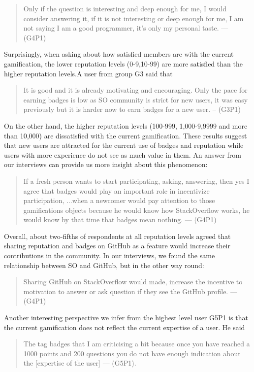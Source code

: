 \documentclass{sigchi}
\begin{document}
\begin{quote}
Only if the question is interesting and deep enough for me, I would consider answering it, if it is not interesting or deep enough for me, I am not saying I am a good programmer, it’s only my personal taste. --- (G4P1)
\end{quote}


Surprisingly, when asking about how satisfied members are with the current gamification, the lower reputation levels (0-9,10-99) are more satisfied than the higher reputation levels.A user from group G3 said that
\begin{quote}
It is good and it is already motivating and encouraging. Only the pace for earning badges is low as SO community is strict for new users, it was easy previously but it is harder now to earn badges for a new user. -- (G3P1)
\end{quote}

On the other hand, the higher  reputation levels (100-999, 1,000-9,9999 and more than 10,000) are dissatisfied with the current gamification.  These results suggest that new users are attracted for the current use of badges and reputation while users with more experience do not see as much value in them. An answer from our interviews can provide us more insight about this phenomenon:

\begin{quote}
If a fresh person wants to start participating, asking, answering, then yes I agree that badges would play an important role in incentivize participation, ...when a newcomer would pay attention to those gamifications objects because he would know how StackOverflow works, he would know by that time that badges mean nothing. --- (G4P1)
\end{quote}

Overall, about two-fifths of respondents at all reputation levels agreed that sharing reputation and badges on GitHub as a feature would increase their contributions in the community. In our interviews, we found the same relationship between SO and GitHub, but in the other way round:

\begin{quote}
Sharing GitHub on StackOverflow would made, increase the incentive to motivation to answer or ask question if they see the GitHub profile. --- (G4P1)
\end{quote}

Another interesting perspective we infer from the highest level user G5P1 is that the current gamification does not reflect the current expertise of a user. He said
\begin{quote}
The tag badges that I am criticising a bit because once you have reached a 1000 points and 200 questions you do not have enough indication about the [expertise of the user] --- (G5P1).
\end{quote}
\end{document}

